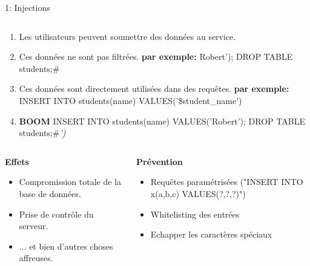 \documentclass[final,hyperref={pdfpagelabels=false}]{beamer}
\begin{document}
\begin{frame}[t]
\begin{columns}[t]
\begin{column}{.465\textwidth}
\begin{block}{1: Injections}
\begin{columns}
		\begin{column}{.875\textwidth}
			\begin{enumerate}
			\item Les utilisateurs peuvent soumettre des données au service.
			\item Ces données ne sont pas filtrées. \textbf{par exemple:} Robert'); DROP TABLE students;\# 
			\item Ces données sont directement utilisées dans des requêtes. \textbf{par exemple:} INSERT INTO students(name) VALUES('\$student\_name')
			\item \textbf{BOOM} INSERT INTO students(name) VALUES('Robert'); DROP TABLE students;\#\textit{')}
			\end{enumerate}
		\end{column}
	\end{columns}

	\begin{columns}
	\begin{column}{.5\textwidth} %
	\textbf{Effets}
	\begin{itemize}
		\item Compromission totale de la base de données.
		\item Prise de contrôle du serveur.
		\item ... et bien d'autres choses affreuses.
	\end{itemize}
		\end{column}

	\begin{column}{.5\textwidth} %
	\textbf{Prévention}
	\begin{itemize}
		\item Requêtes paramétrisées ("INSERT INTO x(a,b,c) VALUES(?,?,?)")
		\item Whitelisting des entrées 
		\item Echapper les caractères spéciaux
	\end{itemize}
		\end{column}
	\end{columns}

\end{block}

            

\end{column}
\end{columns}
\end{frame}
\end{document}
